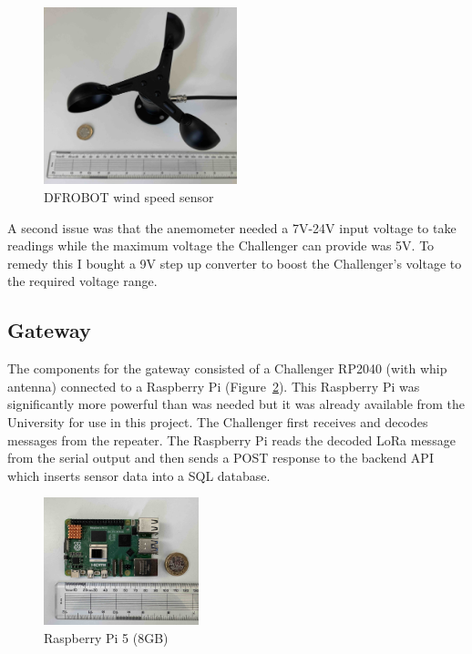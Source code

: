 \begin{figure}[H]
    \centering
    \includegraphics[width=0.5\textwidth]{contents/part-2/fig2/wind-sensor.jpg}
    \caption{DFROBOT wind speed sensor}
    \label{fig:wind-sensor}
\end{figure}

A second issue was that the anemometer needed a 7V-24V input voltage to take
readings while the maximum voltage the Challenger can provide was 5V. To remedy
this I bought a 9V step up converter to boost the Challenger's voltage to the
required voltage range.

\subsection{Gateway}

The components for the gateway consisted of a Challenger RP2040 (with whip
antenna) connected to a Raspberry Pi (Figure~\ref{fig:raspberry-pi}). This
Raspberry Pi was significantly more powerful than was needed but it was already
available from the University for use in this project. The Challenger first
receives and decodes messages from the repeater. The Raspberry Pi reads the
decoded LoRa message from the serial output and then sends a POST response to
the backend API which inserts sensor data into a SQL database.

\begin{figure}[H]
    \centering
    \includegraphics[width=0.4\textwidth]{contents/part-2/fig2/raspberry-pi.jpg}
    \caption{Raspberry Pi 5 (8GB)}
    \label{fig:raspberry-pi}
\end{figure}

